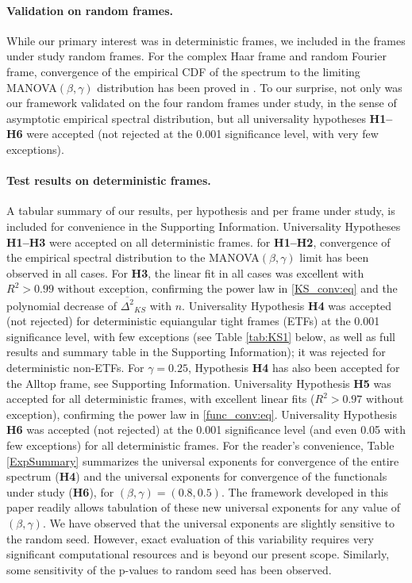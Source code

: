 \documentclass[a4paper,12pt]{article}
\newcommand{\TODO}[1]{ {\tt \color{red} [TODO:#1] } }
\begin{document}
\paragraph{Validation on random frames.}
While our primary interest was in deterministic frames, we included in the
frames under study random frames. For the complex Haar frame and random Fourier
frame, convergence of the empirical CDF of the spectrum to the limiting
MANOVA$(\beta,\gamma)$ distribution has been proved in
\cite{Farrell,Edelman}. To our surprise, not only was our framework validated on
the four random frames under study, in the sense of asymptotic empirical spectral
distribution, but all universality hypotheses {\bf H1--H6} were accepted (not
rejected at the 0.001 significance level, with very few exceptions).

\paragraph{Test results on deterministic frames.}
A tabular summary of our results, per hypothesis and per frame under study, is included for convenience in the Supporting Information. 
Universality Hypotheses {\bf H1--H3} were accepted on all deterministic frames.
for {\bf H1--H2}, 
convergence of the empirical spectral distribution to the MANOVA$(\beta,\gamma)$
limit has been observed in all cases. For {\bf H3}, the linear fit in all cases
was excellent with $R^2>0.99$ without exception, confirming the power law 
in \eqref{KS_conv:eq} and the polynomial 
decrease of $\overline{\Delta^2}_{KS}$
with $n$.
Universality Hypothesis {\bf H4} was accepted (not rejected) for deterministic
equiangular tight
frames (ETFs) %
at the 0.001 significance level, with few exceptions (see Table \ref{tab:KS1} below, as well as full results and summary table in the Supporting Information); it was rejected for
deterministic non-ETFs. For $\gamma=0.25$, Hypothesis {\bf H4} has also been accepted for the Alltop frame, see Supporting Information.  
Universality Hypothesis {\bf H5} was accepted for all deterministic frames, with
excellent linear fits ($R^2>0.97$ without exception), confirming the power law
in  \eqref{func_conv:eq}.
Universality Hypothesis {\bf H6} was accepted (not rejected) at the 0.001
significance level (and even 0.05 with few exceptions) for all deterministic frames.
%
For the reader's convenience, 
Table \ref{ExpSummary} summarizes the universal
exponents for convergence of the entire
spectrum ({\bf H4}) and the universal exponents for convergence of 
the functionals under study ({\bf H6}), for $(\beta,\gamma)=(0.8,0.5)$.
The framework developed in this paper readily allows tabulation of these new
universal exponents for any value of $(\beta,\gamma)$.
%
We have observed that the universal exponents are slightly sensitive to the random seed. However, exact evaluation of this variability requires very significant computational resources and is beyond our present scope. Similarly, some sensitivity of the p-values to random seed has been observed.
\end{document}
